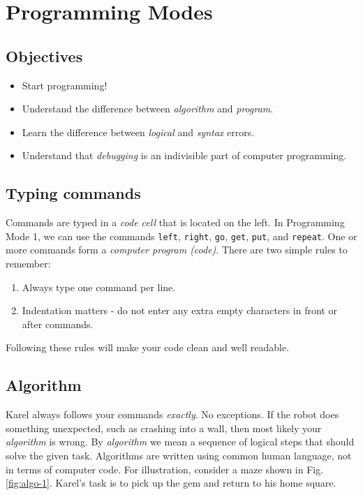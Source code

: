 \section{Programming Modes} \label{sec:bridge}

\subsection{Objectives} 
 
\begin{itemize}
\item Start programming!
\item Understand the difference between {\em algorithm} and {\em program}. 
\item Learn the difference between {\em logical} and {\em syntax} errors.
\item Understand that {\em debugging} is an indivisible part of computer programming.
\end{itemize}

\subsection{Typing commands}

Commands are typed in a {\em code cell} that is located on the left.
In Programming Mode 1, we can use the commands {\tt left}, {\tt right}, {\tt go}, {\tt get}, 
{\tt put}, and {\tt repeat}. 
One or more commands form a {\em computer program (code)}. 
There are two simple rules to remember:\\

\begin{gbox}
\begin{enumerate}
\item Always type one command per line.
\item Indentation matters - do not enter any extra empty characters in front or after commands. 
\end{enumerate}
\end{gbox}
\vspace{6mm}

\noindent
Following these rules will make your code clean and well readable. 

\subsection{Algorithm} \label{subsec:interm1}

Karel always follows your commands {\em exactly}. No exceptions. If the robot does something 
unexpected, such as crashing into a wall, then most likely your 
{\em algorithm} is wrong. By {\em algorithm} we mean a sequence of 
logical steps that should solve the given task. Algorithms are written using 
common human language, not in terms of computer code. For illustration, consider 
a maze shown in Fig. \ref{fig:algo-1}. Karel's task is to pick up the gem and 
return to his home square.

